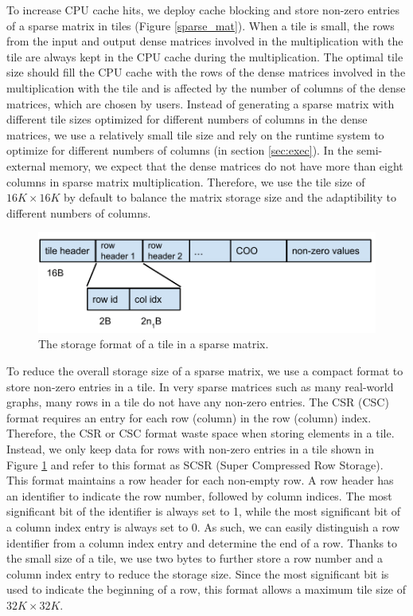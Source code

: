 To increase CPU cache hits, we deploy cache blocking \cite{Im04} and store
non-zero entries of a sparse matrix in tiles (Figure \ref{sparse_mat}).
When a tile is small, the rows from the input and output dense matrices
involved in the multiplication with the tile are always kept in the CPU cache
during the multiplication. The optimal tile size should fill the CPU cache
with the rows of the dense matrices involved in the multiplication with
the tile and is affected by the number of columns of the dense matrices,
which are chosen by users. Instead of generating a sparse matrix with
different tile sizes optimized for different numbers of columns in the dense
matrices, we use a relatively small tile size and rely on the runtime system
to optimize for different numbers of columns (in section \ref{sec:exec}).
In the semi-external memory, we expect that the dense matrices do not
have more than eight columns in sparse matrix multiplication. Therefore, we
use the tile size of $16K \times 16K$ by default to balance the matrix storage
size and the adaptibility to different numbers of columns.

\begin{figure}
\centering
\includegraphics[scale=0.5]{./tile_format.pdf}
\vspace{-5pt}
\caption{The storage format of a tile in a sparse matrix.}
\vspace{-5pt}
\label{tile_format}
\end{figure}

To reduce the overall storage size of a sparse matrix, we use a compact format
to store non-zero entries in a tile. In very sparse matrices such as
many real-world graphs, many rows in a tile do not have any non-zero entries.
The CSR (CSC) format requires an entry for each row (column) in the row
(column) index. Therefore, the CSR or CSC format waste space when storing elements
in a tile. Instead, we only keep data for rows with non-zero entries in a tile
shown in Figure \ref{tile_format} and refer to this format as SCSR (Super
Compressed Row Storage). This format maintains a row header for each non-empty
row. A row header has an identifier to indicate the row number, followed by
column indices. 
The most significant bit of the identifier is always set to 1, while the most
significant bit of a column index entry is always set to 0. As such, we can easily
distinguish a row identifier from a column index entry and determine the end
of a row. Thanks to the small size of a tile, we use two bytes to further store a row
number and a column index entry to reduce the storage size. Since the most
significant bit is used to indicate the beginning of a row, this format allows
a maximum tile size of $32K \times 32K$.

